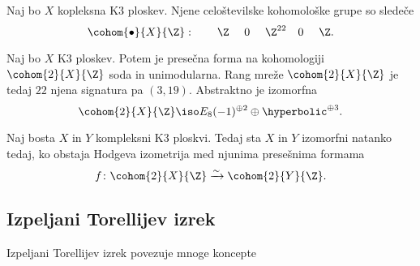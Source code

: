 \begin{trditev}
    Naj bo $X$ kopleksna K3 ploskev. Njene celoštevilske kohomološke grupe so sledeče
    \begin{equation}
        \cohom{\bullet}{X}{\Z}: \qquad \Z \ \quad 0\ \quad \Z^{22} \quad 0\ \quad \Z.
    \end{equation}
\end{trditev}

\begin{trditev}
    Naj bo $X$ K3 ploskev. Potem je presečna forma na kohomologiji $\cohom{2}{X}{\Z}$ soda in unimodularna. Rang mreže $\cohom{2}{X}{\Z}$ je tedaj $22$ njena signatura pa $(3,19)$. Abstraktno je izomorfna
    \begin{equation}
        \cohom{2}{X}{\Z} \iso E_8(-1)^{\oplus 2} \oplus \hyperbolic^{\oplus 3}.
    \end{equation}
\end{trditev}

\begin{izrek}
    Naj bosta $X$ in $Y$ kompleksni K3 ploskvi. Tedaj sta $X$ in $Y$ izomorfni natanko tedaj, ko obstaja Hodgeva izometrija med njunima presešnima formama
    \[
        f\colon \cohom{2}{X}{\Z} \xrightarrow{\sim} \cohom{2}{Y}{\Z}.
    \]
\end{izrek}


\subsection*{Izpeljani Torellijev izrek}

Izpeljani Torellijev izrek povezuje mnoge koncepte 



